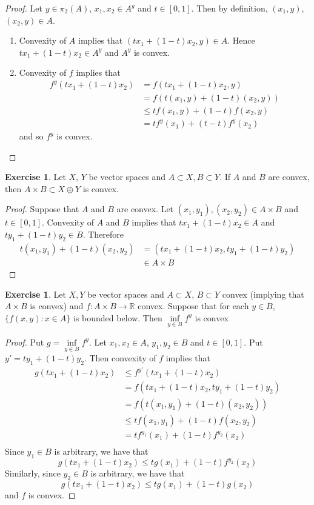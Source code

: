 \documentclass[12pt]{amsart}
\theoremstyle{definition}
\theoremstyle{remark}
\theoremstyle{definition}
\newtheorem{ex}[definition]{Exercise}
\newcommand{\R}{\mathbb{R}}
\begin{document}
	\begin{proof}
	Let $y \in \pi_2(A)$, $x_1, x_2 \in A^y$ and $t \in [0,1]$. Then by definition, $(x_1, y)$, $(x_2, y) \in A$.
	\begin{enumerate}
	\item  Convexity of $A$ implies that $(tx_1 + (1-t)x_2, y) \in A$. Hence $tx_1 + (1-t)x_2 \in A^y$ and $A^y$ is convex. 
	\item Convexity of $f$ implies that 
	\begin{align*}
	f^y(tx_1 + (1-t)x_2)
	&= f(tx_1 + (1-t)x_2, y) \\
	&= f(t(x_1, y) + (1-t)(x_2,y)) \\
	& \leq tf(x_1, y) + (1-t) f(x_2,y) \\
	&= tf^y(x_1) + (t-t)f^y(x_2)
\end{align*}	  
	and so $f^y$ is convex.
	\end{enumerate}
	\end{proof}
	
	\begin{ex}
	Let $X$, $Y$ be vector spaces and $A\subset X, B \subset Y$. If $A$ and $B$ are convex, then $A \times B \subset X \oplus Y$ is convex.
	\end{ex}	
	
	\begin{proof}
	Suppose that $A$ and $B$ are convex. Let $(x_1,y_1), (x_2,y_2) \in A \times B$ and $t \in [0,1]$. Convexity of $A$ and $B$ implies that $tx_1 + (1-t)x_2 \in A$ and $ty_1 + (1-t)y_2 \in B$. Therefore 
	\begin{align*}
	t(x_1,y_1) + (1-t)(x_2,y_2) 
	&= (tx_1 + (1-t)x_2, ty_1 + (1-t)y_2) \\
	& \in A \times B
\end{align*}	 
	\end{proof}
	
	\begin{ex}
	Let $X, Y$ be vector spaces and $A \subset X$, $B \subset Y$ convex (implying that $A \times B$ is convex)  and $f:A \times B \rightarrow \R$ convex. Suppose that for each $y \in B$, $\{f(x, y): x \in A\}$ is bounded below. Then $\inf\limits_{y \in B}f^y$ is convex
	\end{ex}
	
	\begin{proof}
	Put $g = \inf\limits_{y \in B}f^y$. 
	Let $x_1, x_2 \in A$, $y_1, y_2 \in B$ and $t \in [0,1]$. Put $y'= ty_1 + (1-t)y_2$. Then convexity of $f$ implies that
	\begin{align*}
	g(tx_1 + (1-t)x_2) 
	& \leq f^{y'}(tx_1 + (1-t)x_2) \\
	&= f(tx_1 + (1-t)x_2, ty_1 + (1-t)y_2)\\
	&= f(t(x_1,y_1) + (1-t)(x_2, y_2)) \\
	& \leq tf(x_1, y_1) + (1-t)f(x_2, y_2) \\
	&= tf^{y_1}(x_1) + (1-t)f^{y_2}(x_2) \\
	\end{align*}
	Since $y_1 \in B$ is arbitrary, we have that $$g(tx_1 + (1-t)x_2) \leq tg(x_1) + (1-t)f^{y_2}(x_2)$$ Similarly, since $y_2 \in B$ is arbitrary, we have that $$g(tx_1 + (1-t)x_2) \leq tg(x_1) + (1-t)g(x_2)$$ and $f$ is convex.
	\end{proof}	
\end{document}
